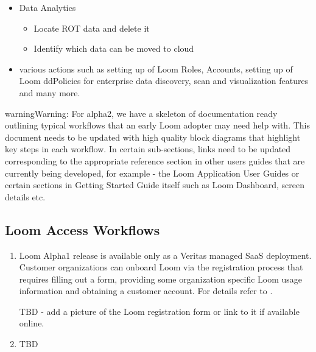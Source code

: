 \documentclass[letterpaper,10pt,english]{sphinxmanual}
\begin{document}
\begin{itemize}
\begin{itemize}
\end{itemize}

\item {} 
Data Analytics
\begin{itemize}
\item {} 
Locate ROT data and delete it

\item {} 
Identify which data can be moved to cloud

\end{itemize}

\item {} 
various actions such as setting up of Loom Roles, Accounts, setting up of Loom ddPolicies for enterprise data discovery, scan and visualization features and many more.

\end{itemize}

\begin{sphinxadmonition}{warning}{Warning:}
For alpha2, we have a skeleton of documentation ready outlining typical workflows that an early Loom adopter may need help with.  This document needs to be updated with high quality block diagrams that highlight key steps in each workflow.  In certain sub-sections, links need to be updated corresponding to the appropriate reference section in other users guides that are currently being developed, for example - the Loom Application User Guides or certain sections in Getting Started Guide itself such as Loom Dashboard, screen details etc.
\end{sphinxadmonition}


\subsection{Loom Access Workflows}
\label{\detokenize{loom_getting_started_guide:loom-access-workflows}}\label{\detokenize{loom_getting_started_guide:usage-wf-access}}\begin{enumerate}
\item {} 

Loom Alpha1 release is available only as a Veritas managed SaaS deployment.  Customer organizations can onboard Loom via the registration process that requires filling out a form, providing
some organization specific Loom usage information and obtaining a customer account. For details refer to .

TBD - add a picture of the Loom registration form or link to it if available online.

\item {} 

TBD

\end{enumerate}
\end{document}
